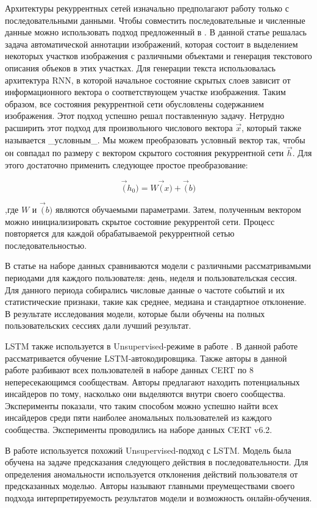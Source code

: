 Архитектуры рекуррентных сетей изначально предполагают работу только с последовательными данными. Чтобы совместить последовательные и численные данные можно использовать подход предложенный в \cite{karpathyDeepVisualSemanticAlignments2015}. В данной статье решалась задача автоматической аннотации изображений, которая состоит в выделением некоторых участков изображения с различными объектами и генерация текстового описания объеков в этих участках. Для генерации текста использовалась архитектура RNN, в которой начальное состояние скрытых слоев зависит от информационного вектора о соответствующем участке изображения. Таким образом, все состояния рекуррентной сети обусловлены содержанием изображения. Этот подход успешно решал поставленную задачу.
Нетрудно расширить этот подход для произвольного числового вектора $\overrightarrow{x}$, который также называется _условным_. Мы можем преобразовать условный вектор так, чтобы он совпадал по размеру с вектором скрытого состояния рекуррентной сети $\overrightarrow{h}$. Для этого достаточно применить следующее простое преобразование:

$$\overrightarrow(h_0) = W\overrightarrow(x) + \overrightarrow(b)$$

,где $W$ и $\overrightarrow(b)$ являются обучаемыми параметрами. Затем, полученным вектором можно инициализировать скрытое состояние рекуррентой сети. Процесс повторяется для каждой обрабатываемой рекуррентной сетью последовательностью.

В статье \cite{leAnalyzingDataGranularity2020b} на наборе данных сравниваются модели с различными рассматривамыми периодами для каждого пользователя: день, неделя и пользовательская сессия. Для данного периода собирались числовые данные о частоте событий и их статистические признаки, такие как среднее, медиана и стандартное отклонение. В результате исследования модели, которые были обучены на полных пользовательских сессиях дали лучший результат.

LSTM также используется в Unsupervised-режиме в работе \cite{paulLACLSTMAUTOENCODER}. В данной работе рассматривается обучение LSTM-автокодировщика. Также авторы в данной работе разбивают всех пользователей в наборе данных CERT по 8 непересекающимся сообществам. Авторы предлагают находить потенциальных инсайдеров по тому, насколько они выделяются внутри своего сообщества. Эксперименты показали, что таким способом можно успешно найти всех инсайдеров среди пяти наиболее аномальных пользователей из каждого сообщества. Эксперименты проводились на наборе данных CERT v6.2.

В работе \cite{tuorDeepLearningUnsupervised2017} используется похожий Unsupervised-подход с LSTM. Модель была обучена на задаче предсказания следующего действия в последовательности. Для определения аномальности используется отклонения действий пользователя от предсказанных моделью. Авторы называют главными преумеществами своего подхода интерпретируемость результатов модели и возможность онлайн-обучения.
